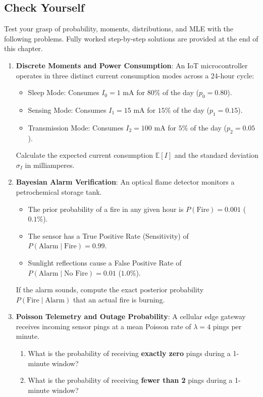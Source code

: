\subsection{Check Yourself}\label{subsec:prob_check_yourself}

Test your grasp of probability, moments, distributions, and MLE with the following problems. Fully worked step-by-step solutions are provided at the end of this chapter.

\begin{checkyourself}
\begin{enumerate}
    \item \textbf{Discrete Moments and Power Consumption}:
    An IoT microcontroller operates in three distinct current consumption modes across a 24-hour cycle:
    \begin{itemize}
        \item Sleep Mode: Consumes $I_0 = 1\text{ mA}$ for $80\%$ of the day ($p_0 = 0.80$).
        \item Sensing Mode: Consumes $I_1 = 15\text{ mA}$ for $15\%$ of the day ($p_1 = 0.15$).
        \item Transmission Mode: Consumes $I_2 = 100\text{ mA}$ for $5\%$ of the day ($p_2 = 0.05$).
    \end{itemize}
    Calculate the expected current consumption $\mathbb{E}[I]$ and the standard deviation $\sigma_I$ in milliamperes.

    \item \textbf{Bayesian Alarm Verification}:
    An optical flame detector monitors a petrochemical storage tank.
    \begin{itemize}
        \item The prior probability of a fire in any given hour is $P(\text{Fire}) = 0.001$ ($0.1\%$).
        \item The sensor has a True Positive Rate (Sensitivity) of $P(\text{Alarm} \mid \text{Fire}) = 0.99$.
        \item Sunlight reflections cause a False Positive Rate of $P(\text{Alarm} \mid \text{No Fire}) = 0.01$ ($1.0\%$).
    \end{itemize}
    If the alarm sounds, compute the exact posterior probability $P(\text{Fire} \mid \text{Alarm})$ that an actual fire is burning.

    \item \textbf{Poisson Telemetry and Outage Probability}:
    A cellular edge gateway receives incoming sensor pings at a mean Poisson rate of $\lambda = 4$ pings per minute.
    \begin{enumerate}[label=(\alph*)]
        \item What is the probability of receiving \textbf{exactly zero} pings during a 1-minute window?
        \item What is the probability of receiving \textbf{fewer than 2} pings during a 1-minute window?
    \end{enumerate}


\end{enumerate}
\end{checkyourself}
